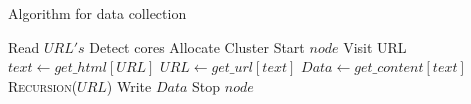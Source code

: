 \documentclass[]{article}
\begin{document}
\clearpage


\begin{algorithm}[h]
	\caption{Algorithm for data collection}
	\label{alg:dc}
	\begin{algorithmic}
		\State Read $URL's$
		\State Detect cores
		\State Allocate Cluster
		\State Start $node$
		\State\Return
		\Else
		\State Visit URL
		\State $text \gets get\_html[URL]$
		\State $URL  \gets get\_url[text]$
		\State $Data \gets get\_content[text]$
		\State \Return \textsc{Recursion}{($URL$)}
		\EndIf
		\State Write $Data$
		\EndProcedure
		\State Stop $node$
		\EndFor	
	\end{algorithmic}
\end{algorithm}

\end{document}
